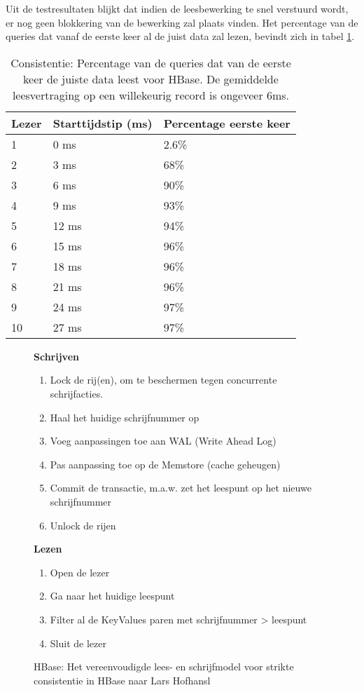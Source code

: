 Uit de testresultaten blijkt dat indien de leesbewerking te snel verstuurd wordt, er nog geen blokkering van de bewerking zal plaats vinden. Het percentage van de queries dat vanaf de eerste keer al de juist data zal lezen, bevindt zich in tabel \ref{table:consistentie-hbase-correct}.



\begin{table}
\centering
\begin{tabular}{l| l l}
	\textbf{Lezer} & \textbf{Starttijdstip (ms)} & \textbf{Percentage eerste keer} \\
	\hline
	1 &  0 ms & 2.6\%\\
	2 &  3 ms & 68\%\\
	3 &  6 ms & 90\%\\
	4 &  9 ms & 93\%\\
	5 &  12 ms & 94\%\\
	6 &  15 ms & 96\%\\
	7 &  18 ms & 96\%\\
	8 &  21 ms & 96\%\\
	9 &  24 ms & 97\%\\
	10 & 27 ms & 97\% 
\end{tabular}
\caption{Consistentie: Percentage van de queries dat van de eerste keer de juiste data leest voor HBase. De gemiddelde leesvertraging op een willekeurig record is ongeveer 6ms. }
\label{table:consistentie-hbase-correct}
\end{table}

\begin{figure}[tb!]
	\begin{minipage}{0.5\textwidth} 
	\textbf{Schrijven}
	\begin{enumerate}
	\item Lock de rij(en), om te beschermen tegen concurrente schrijfacties. 
	\item Haal het huidige schrijfnummer op
	\item Voeg aanpassingen toe aan WAL (Write Ahead Log)
	\item Pas aanpassing toe op de Memstore (cache geheugen)
	\item Commit de transactie, m.a.w. zet het leespunt op het nieuwe schrijfnummer
	\item Unlock de rijen
	\end{enumerate}
	\end{minipage} \hfill
	\begin{minipage}{0.3\textwidth} 
	\textbf{Lezen}
	\begin{enumerate}
	\item Open de lezer
	\item Ga naar het huidige leespunt
	\item Filter al de KeyValues paren met schrijfnummer > leespunt
	\item Sluit de lezer
	\end{enumerate}
	\end{minipage}
	\caption{HBase: Het vereenvoudigde lees- en schrijfmodel voor strikte consistentie in HBase naar Lars Hofhansl\cite{hbase-acid}}\label{fig:consistency-hbase-uitleg}
\end{figure}

